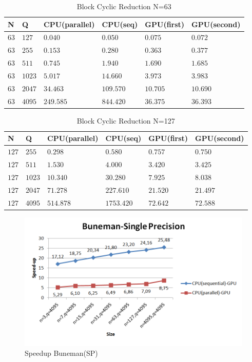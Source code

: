    \begin{table}[H]
\caption{Block Cyclic Reduction N=63} 
\centering 
\begin{tabular}{| l |  p{1cm} |p{}| p{} |  p{}| p{} |} 
\hline\hline 
N & Q & CPU(parallel) & CPU(seq) & GPU(first)  & GPU(second) \\ [0.8ex] 
\hline

$63$ &	$127$ & $0.040$	&	$0.050$ & $0.075$ & $0.072$ \\
$63$ &	$255$ & $0.153$	&	$0.280$ & $0.363$ & $0.377$\\
$63$ &	$511$ & $0.745$	&	$1.940$ & $1.690$ & $1.685$ \\
$63$ &	$1023$ & $5.017$	&	 $14.660$ & $3.973$ & $3.983$ \\
$63$ &	$2047$ & $34.463$	&	$109.570$ & $10.705$ & $10.690$ \\
$63$ &	$4095$ & $249.585$	&	$844.420$ & $36.375$ & $36.393$ \\[1ex]
\hline 
\end{tabular}
\label{table:bcr_n=63} 
\end{table}

   \begin{table}[H]
\caption{Block Cyclic Reduction N=127} 
\centering 
\begin{tabular}{| l |  p{1cm} |p{}| p{} |  p{}| p{} |} 
\hline\hline 
N & Q & CPU(parallel) & CPU(seq) & GPU(first)  & GPU(second) \\ [0.8ex] 
\hline
$127$ &	$255$ & $0.298$	&	$0.580$ &	$0.757$ & $0.750$ \\
$127$ &	$511$ & $1.530$	&	$4.000$ & 	$3.420$ & $3.425$ \\
$127$ &	$1023$ & $10.340$	& $30.280$ & 	$7.925$ & $8.038$ \\
$127$ &	$2047$ & $71.278$	& $227.610$ & 	$21.520$ & $21.497$ \\
$127$ &	$4095$ & $514.878$	& $1753.420$ & 	$72.642$ & $72.588$\\[1ex]
\hline 
\end{tabular}
\label{table:bcr_n=127} 
\end{table}


\begin{figure}[H]
   \centering
       \includegraphics[width=1\textwidth]{grafhmata/buneman_sp_speedup.png}
   \caption{Speedup Buneman(SP)}
   \label{fig:Speedup Buneman(SP)}
\end{figure}


